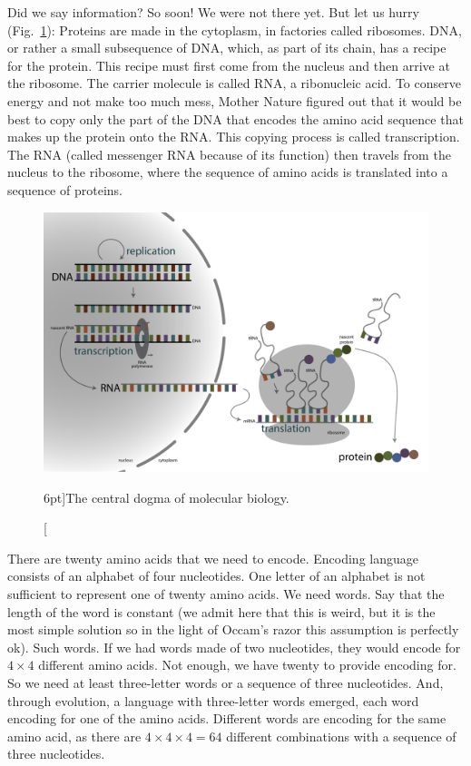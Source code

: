 Did we say information? So soon! We were not there yet. But let us hurry (Fig.~\ref{fig:central-dogma}): Proteins are made in the cytoplasm, in factories called ribosomes. DNA, or rather a small subsequence of DNA, which, as part of its chain, has a recipe for the protein. This recipe must first come from the nucleus and then arrive at the ribosome. The carrier molecule is called RNA, a ribonucleic acid. To conserve energy and not make too much mess, Mother Nature figured out that it would be best to copy only the part of the DNA that encodes the amino acid sequence that makes up the protein onto the RNA. This copying process is called transcription. The RNA (called messenger RNA because of its function) then travels from the nucleus to the ribosome, where the sequence of amino acids is translated into a sequence of proteins.

\begin{figure}
    \includegraphics{figs/molbiol/central-dogma.png}
    \caption[][6pt]{The central dogma of molecular biology.}
    \label{fig:central-dogma}
\end{figure}

There are twenty amino acids that we need to encode. Encoding language consists of an alphabet of four nucleotides. One letter of an alphabet is not sufficient to represent one of twenty amino acids. We need words. Say that the length of the word is constant (we admit here that this is weird, but it is the most simple solution so in the light of Occam's razor this assumption is perfectly ok). Such words. If we had words made of two nucleotides, they would encode for $4\times 4$ different amino acids. Not enough, we have twenty to provide encoding for. So we need at least three-letter words or a sequence of three nucleotides. And, through evolution, a language with three-letter words emerged, each word encoding for one of the amino acids. Different words are encoding for the same amino acid, as there are $4\times 4\times 4=64$ different combinations with a sequence of three nucleotides.

